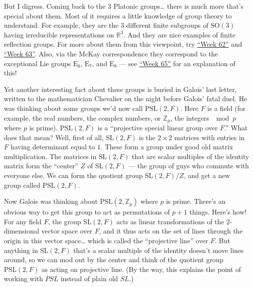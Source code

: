 \documentclass{article}
\def\tightlist{}
\renewcommand{\texttt}[1]{%
  \begingroup
  \ttfamily
  \begingroup\lccode`~=`/\lowercase{\endgroup\def~}{/\discretionary{}{}{}}%
  \begingroup\lccode`~=`[\lowercase{\endgroup\def~}{[\discretionary{}{}{}}%
  \begingroup\lccode`~=`.\lowercase{\endgroup\def~}{.\discretionary{}{}{}}%
  \catcode`/=\active\catcode`[=\active\catcode`.=\active
  \scantokens{#1\noexpand}%
  \endgroup
}
\begin{document}

But I digress. Coming back to the 3 Platonic groups\ldots{} there is
much more that's special about them. Most of it requires a little
knowledge of group theory to understand. For example, they are the 3
different finite subgroups of \(\mathrm{SO}(3)\) having irreducible
representations on \(\mathbb{R}^3\). And they are nice examples of
finite reflection groups. For more about them from this viewpoint, try
\protect\hyperlink{week62}{``Week 62''} and
\protect\hyperlink{week63}{``Week 63''}. Also, via the McKay
correspondence they correspond to the exceptional Lie groups
\(\mathrm{E}_6\), \(\mathrm{E}_7\), and \(\mathrm{E}_8\) --- see
\protect\hyperlink{week65}{``Week 65''} for an explanation of this!

Yet another interesting fact about these groups is buried in Galois'
last letter, written to the mathematician Chevalier on the night before
Galois' fatal duel. He was thinking about some groups we'd now call
\(\mathrm{PSL}(2,F)\). Here \(F\) is a field (for example, the real
numbers, the complex numbers, or \(\mathbb{Z}_p\), the integers
\(\mod p\) where \(p\) is prime). \(\mathrm{PSL}(2,F)\) is a
``projective special linear group over \(F\).'' What does that mean?
Well, first of all, \(\mathrm{SL}(2,F)\) is the \(2\times2\) matrices
with entries in \(F\) having determinant equal to \(1\). These form a
group under good old matrix multiplication. The matrices in
\(\mathrm{SL}(2,F)\) that are scalar multiples of the identity matrix
form the ``center'' \(Z\) of \(\mathrm{SL}(2,F)\) --- the group of guys
who commute with everyone else. We can form the quotient group
\(\mathrm{SL}(2,F)/Z\), and get a new group called
\(\mathrm{PSL}(2,F)\).

Now Galois was thinking about \(\mathrm{PSL}(2,\mathbb{Z}_p)\) where
\(p\) is prime. There's an obvious way to get this group to act as
permutations of \(p+1\) things. Here's how! For any field \(F\), the
group \(\mathrm{SL}(2,F)\) acts as linear transformations of the
2-dimensional vector space over \(F\), and it thus acts on the set of
lines through the origin in this vector space\ldots{} which is called
the ``projective line'' over \(F\). But anything in \(\mathrm{SL}(2,F)\)
that's a scalar multiple of the identity doesn't move lines around, so
we can mod out by the center and think of the quotient group
\(\mathrm{PSL}(2,F)\) as acting on projective line. (By the way, this
explains the point of working with \(PSL\) instead of plain old \(SL\).)
\end{document}

